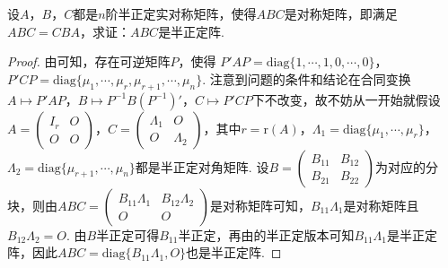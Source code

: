\documentclass[../../main.tex]{subfiles}
\begin{document}
\begin{proposition}\label{proposition:例9.84}
设\(A\)，\(B\)，\(C\)都是\(n\)阶半正定实对称矩阵，使得\(ABC\)是对称矩阵，即满足\(ABC = CBA\)，求证：\(ABC\)是半正定阵.
\end{proposition}
\begin{proof}
由可知，存在可逆矩阵\(P\)，使得
\(P'AP = \mathrm{diag}\{1,\cdots,1,0,\cdots,0\}\)，\(P'CP = \mathrm{diag}\{\mu_1,\cdots,\mu_r,\mu_{r + 1},\cdots,\mu_n\}\).
注意到问题的条件和结论在合同变换\(A\mapsto P'AP\)，\(B\mapsto P^{-1}B(P^{-1})'\)，\(C\mapsto P'CP\)下不改变，故不妨从一开始就假设\(A=\begin{pmatrix}I_r&O\\O&O\end{pmatrix}\)，\(C=\begin{pmatrix}\Lambda_1&O\\O&\Lambda_2\end{pmatrix}\)，其中\(r = \mathrm{r}(A)\)，\(\Lambda_1 = \mathrm{diag}\{\mu_1,\cdots,\mu_r\}\)，\(\Lambda_2 = \mathrm{diag}\{\mu_{r + 1},\cdots,\mu_n\}\)都是半正定对角矩阵. 设\(B=\begin{pmatrix}B_{11}&B_{12}\\B_{21}&B_{22}\end{pmatrix}\)为对应的分块，则由\(ABC=\begin{pmatrix}B_{11}\Lambda_1&B_{12}\Lambda_2\\O&O\end{pmatrix}\)是对称矩阵可知，\(B_{11}\Lambda_1\)是对称矩阵且\(B_{12}\Lambda_2 = O\). 由\(B\)半正定可得\(B_{11}\)半正定，再由的半正定版本可知\(B_{11}\Lambda_1\)是半正定阵，因此\(ABC = \mathrm{diag}\{B_{11}\Lambda_1,O\}\)也是半正定阵. 

\end{proof}
\end{document}
